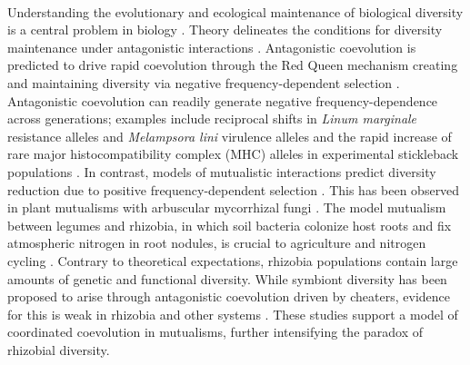 \documentclass[12pt]{article}
\begin{document}
\begin{doublespace}
\paragraph{}
Understanding the evolutionary and ecological maintenance of biological diversity is a central problem in biology \cite{Hutchinson1961,Tilman2000}. 
Theory delineates the conditions for diversity maintenance under antagonistic interactions \cite{Gause1934,Levene1953,Hardin1960,Chesson2000}. Antagonistic coevolution is predicted to drive rapid coevolution through the Red Queen mechanism \cite{Valen1976} creating and maintaining diversity via negative frequency-dependent selection \cite{Doebeli2000,Kopp2006}. Antagonistic coevolution can readily generate negative frequency-dependence across generations; examples include reciprocal shifts in \textit{Linum marginale} resistance alleles and \textit{Melampsora lini} virulence alleles \cite{Thrall2012} and the rapid increase of rare major histocompatibility complex (MHC) alleles in experimental stickleback populations \cite{Eizaguirre2012}. In contrast, models of mutualistic interactions predict diversity reduction due to positive frequency-dependent selection \cite{Law1985, Doebeli2000,Kopp2006}. This has been observed in plant mutualisms with arbuscular mycorrhizal fungi \cite{Mangan2010}. The model mutualism between legumes and rhizobia, in which soil bacteria colonize host roots and fix atmospheric nitrogen in root nodules, is crucial to agriculture and nitrogen cycling \cite{Vance2002,Gruber2008}. Contrary to theoretical expectations, rhizobia populations contain large amounts of genetic \cite{McInnes2004} and functional \cite{Thrall2000} diversity. While symbiont diversity has been proposed to arise through antagonistic coevolution driven by cheaters, evidence for this is weak in rhizobia and other systems \cite{Jones2015,Friesen2012}. These studies support a model of coordinated coevolution in mutualisms, further intensifying the paradox of rhizobial diversity. 

\end{doublespace}
\end{document}
